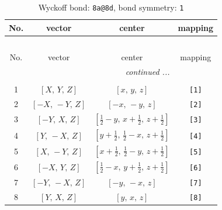 \documentclass[fleqn,8pt]{jsarticle}
\begin{document}
\begin{longtable}{cccc}
\caption{Wyckoff bond: {\tt 8a@8d}, bond symmetry: {\tt 1}}
 \\
 \hline \hline
No. & vector & center & mapping \\ \hline \endfirsthead

\multicolumn{3}{l}{\tablename\ \thetable{}} \\
 \hline \hline
No. & vector & center & mapping \\ \hline \endhead

 \hline \hline
\multicolumn{3}{r}{\footnotesize\it continued ...} \\ \endfoot

 \hline \hline
\multicolumn{3}{r}{} \\ \endlastfoot

1 & $\left[ X,\, Y,\, Z \right]$ & $\left[ x,\, y,\, z \right]$ & {\tt [1]} \\ \hline
2 & $\left[ - X,\, - Y,\, Z \right]$ & $\left[ - x,\, - y,\, z \right]$ & {\tt [2]} \\ \hline
3 & $\left[ - Y,\, X,\, Z \right]$ & $\left[ \frac{1}{2} - y,\, x + \frac{1}{2},\, z + \frac{1}{2} \right]$ & {\tt [3]} \\ \hline
4 & $\left[ Y,\, - X,\, Z \right]$ & $\left[ y + \frac{1}{2},\, \frac{1}{2} - x,\, z + \frac{1}{2} \right]$ & {\tt [4]} \\ \hline
5 & $\left[ X,\, - Y,\, Z \right]$ & $\left[ x + \frac{1}{2},\, \frac{1}{2} - y,\, z + \frac{1}{2} \right]$ & {\tt [5]} \\ \hline
6 & $\left[ - X,\, Y,\, Z \right]$ & $\left[ \frac{1}{2} - x,\, y + \frac{1}{2},\, z + \frac{1}{2} \right]$ & {\tt [6]} \\ \hline
7 & $\left[ - Y,\, - X,\, Z \right]$ & $\left[ - y,\, - x,\, z \right]$ & {\tt [7]} \\ \hline
8 & $\left[ Y,\, X,\, Z \right]$ & $\left[ y,\, x,\, z \right]$ & {\tt [8]} \\
\end{longtable}
\end{document}
